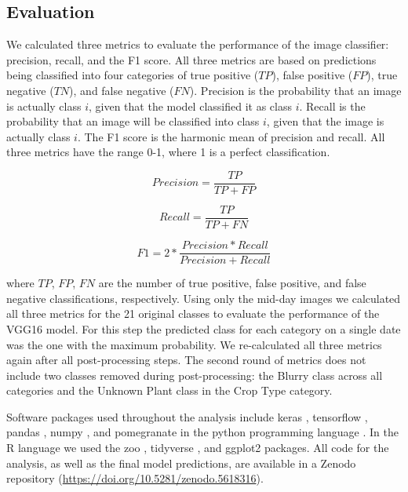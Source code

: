 \documentclass[remotesensing,article,submit,moreauthors,pdftex]{Definitions/mdpi}
\begin{document}
\subsection{Evaluation}

We calculated three metrics to evaluate the performance of the image classifier: precision, recall, and the F1 score. All three metrics are based on predictions being classified into four categories of true positive ($TP$), false positive ($FP$), true negative ($TN$), and false negative ($FN$). Precision is the probability that an image is actually class $i$, given that the model classified it as class $i$. Recall is the probability that an image will be classified into class $i$, given that the image is actually class $i$. The F1 score is the harmonic mean of precision and recall. All three metrics have the range 0-1, where 1 is a perfect classification. 

\begin{equation}
Precision = \frac{TP}{TP+FP}
\end{equation}

\begin{equation}
Recall = \frac{TP}{TP+FN}
\end{equation}

\begin{equation}
F1 = 2*\frac{Precision*Recall}{Precision+Recall}
\end{equation}

where $TP$, $FP$, $FN$ are the number of true positive, false positive, and false negative classifications, respectively. Using only the mid-day images we calculated all three metrics for the 21 original classes to evaluate the performance of the VGG16 model. For this step the predicted class for each category on a single date was the one with the maximum probability. We re-calculated all three metrics again after all post-processing steps. The second round of metrics does not include two classes removed during post-processing: the Blurry class across all categories and the Unknown Plant class in the Crop Type category. 

Software packages used throughout the analysis include keras \citep{chollet2018-keras}, tensorflow \citep{abadi2015-tensorflow}, pandas \citep{mckinney2010-pandas}, numpy \citep{harris2020-numpy}, and pomegranate \citep{schreiber2018-pomegranate} in the python programming language \citep{python2003}. In the R language \citep{rcitation} we used the zoo \citep{zeileis2005-zoo}, tidyverse \citep{wickham2019-tidyverse}, and ggplot2 \citep{wickham2016-ggplot2} packages. All code for the analysis, as well as the final model predictions, are available in a Zenodo repository (\href{https://doi.org/10.5281/zenodo.5618316}{https://doi.org/10.5281/zenodo.5618316}).
\end{document}
